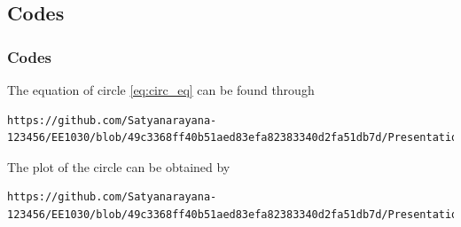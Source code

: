 \documentclass{beamer}
\theoremstyle{remark}
\numberwithin{equation}{section}
\begin{document}
\subsection{Codes}
\begin{frame}[fragile]
    \frametitle{Codes}
    The equation of circle \eqref{eq:circ_eq} can be found through
    {\footnotesize
\begin{lstlisting}
https://github.com/Satyanarayana-123456/EE1030/blob/49c3368ff40b51aed83efa82383340d2fa51db7d/Presentation/matgeo/codes/main.c
\end{lstlisting}
}
    The plot of the circle can be obtained by{\footnotesize
\begin{lstlisting}
https://github.com/Satyanarayana-123456/EE1030/blob/49c3368ff40b51aed83efa82383340d2fa51db7d/Presentation/matgeo/codes/circle.py
\end{lstlisting}
}
    \end{frame}
\end{document}
